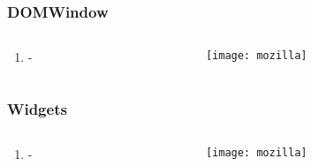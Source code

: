 \documentclass[
	notes=none,
	aspectratio=169
]{beamer}
\begin{document}

\begin{frame}
\frametitle{DOMWindow}

\begin{columns}[T]
\begin{column}[T]{0.5\textwidth}
\setlength{\parskip}{0.5em}

\vspace{1.5cm}
\begin{enumerate}
\setlength{\parskip}{0.5em}
\item -
\end{enumerate}

\end{column}
\begin{column}[T]{0.5\textwidth}
\setlength{\parskip}{0.5em}

\vspace{0.5cm}
\texttt{[image: mozilla]}

\end{column}
\end{columns}

\end{frame}
\note{
\begin{enumerate}
\item -
\end{enumerate}
}


\begin{frame}
\frametitle{Widgets}

\begin{columns}[T]
\begin{column}[T]{0.5\textwidth}
\setlength{\parskip}{0.5em}

\vspace{1.5cm}
\begin{enumerate}
\setlength{\parskip}{0.5em}
\item -
\end{enumerate}

\end{column}
\begin{column}[T]{0.5\textwidth}
\setlength{\parskip}{0.5em}

\vspace{0.5cm}
\texttt{[image: mozilla]}

\end{column}
\end{columns}

\end{frame}
\note{
\begin{enumerate}
\item -
\end{enumerate}
}
\end{document}

